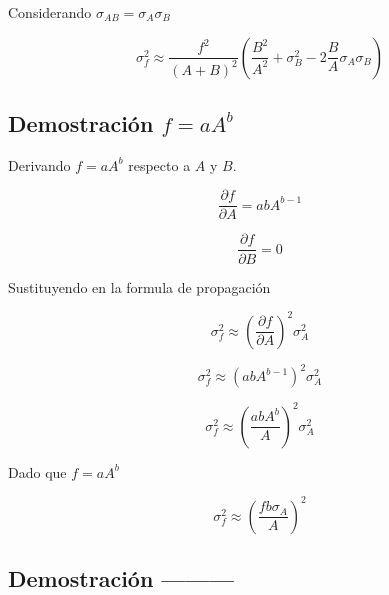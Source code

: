 \documentclass[a4paper,12pt]{article} %
\begin{document}
		Considerando $\sigma_{AB} = \sigma_A\sigma_B$
		
		\[
		\sigma_f^2 \approx \frac{f^2}{(A+B)^2} \left( \frac{B^2}{A^2}  +  \sigma_B^2 - 2 \frac{B}{A} \sigma_A \sigma_B \right)
		\]
		
		\subsection{Demostraci\'on $f = aA^{b}$}
		
		Derivando $f = aA^{b}$ respecto a $A$ y $B$.
		
		\[
		\frac{\partial f}{\partial A} =  a b A^{b-1}
		\]
		
		\[
		\frac{\partial f}{\partial B} = 0
		\]
		
		Sustituyendo en la formula de propagaci\'on 
		
		\[
		\sigma_f^2 \approx \left( \frac{\partial f}{\partial A}  \right)^2 \sigma_A^2
		\]
		
		\[
		\sigma_f^2 \approx \left( a b A^{b-1} \right)^2 \sigma_A^2
		\]
		
		\[
		\sigma_f^2 \approx \left(\frac{a b A^{b}}{A}  \right)^2 \sigma_A^2
		\]
		
		Dado que $f = aA^{b}$ 
		
		
		
		\[
		\sigma_f^2 \approx \left( \frac{f b \sigma_A}{A} \right)^2
		\]
		
		
		\subsection{Demostraci\'on ---------}

	
\end{document}
